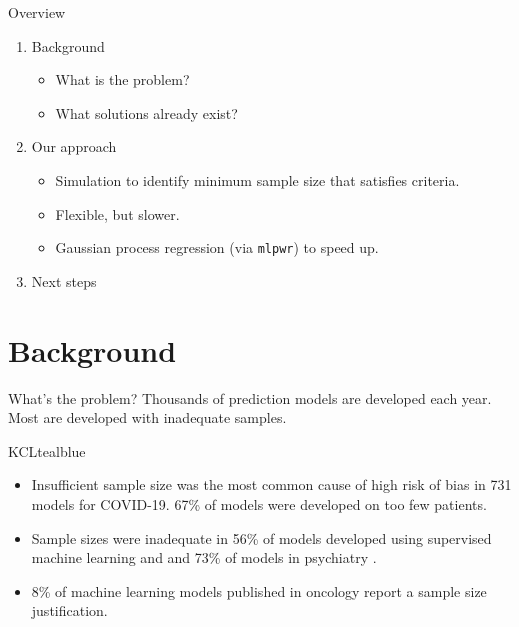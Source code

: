 \documentclass[11pt]{beamer}
\begin{document}
\begin{frame}[t]{Overview}
	\begin{enumerate}
		\item Background
		      \begin{itemize}
			      \item What is the problem?
			      \item What solutions already exist?
		      \end{itemize}
		\item Our approach
		      \begin{itemize}
			      \item Simulation to identify minimum sample size that
			            satisfies criteria.
			      \item Flexible, but slower.
			      \item Gaussian process regression (via \texttt{mlpwr}) to
			            speed up.
		      \end{itemize}
		\item Next steps
	\end{enumerate}
\end{frame}

\section{Background}

\begin{frame}[t]{What's the problem?}
	Thousands of prediction models are developed each year. Most are developed
	with inadequate samples.

	\begin{cbox}{KCLtealblue}{}
		\begin{itemize}
			\item Insufficient sample size was the most common cause of high
			      risk of bias in 731 models for
			      COVID-19.\autocite{wynants2020} \alert{67\%} of models were
			      developed on too few patients.
			\item Sample sizes were inadequate in \alert{56\%} of models
			      developed using supervised machine
			      learning\autocite{navarro2021} and and 73\% of models in
			      psychiatry \autocite{meehan2022}.
			\item 8\% of machine learning models published in oncology report a
			      sample size justification\autocite{dhiman2022}.
		\end{itemize}
	\end{cbox}
\end{frame}
\end{document}
